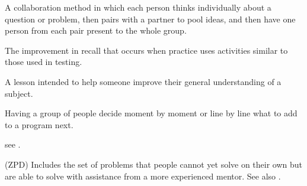 \begin{description}
 A collaboration method in which
each person thinks individually about a question or problem, then pairs with a
partner to pool ideas, and then have one person from each pair present to the
whole group.

 The
improvement in recall that occurs when practice uses activities similar to those
used in testing.

 A lesson intended to help someone improve their
general understanding of a subject.

 Having a group of people decide moment
by moment or line by line what to add to a program next.

 see .

 (ZPD) Includes the set of problems that
people cannot yet solve on their own but are able to solve with assistance from
a more experienced mentor.  See also .

\end{description}
